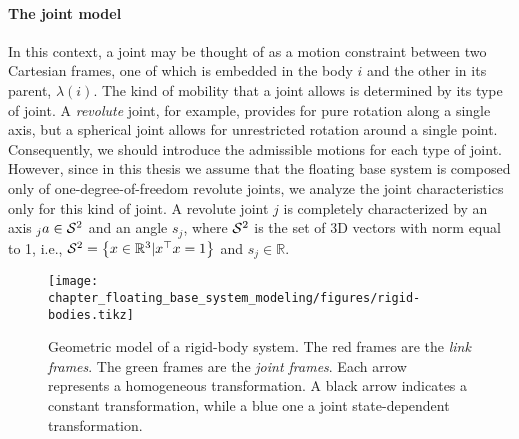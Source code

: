\paragraph{The joint model}
In this context, a joint may be thought of as a motion constraint between two Cartesian frames, one of which is embedded in the body $i$ and the other in its parent, $\lambda(i)$.
The kind of mobility that a joint allows is determined by its type of joint. A \emph{revolute} joint, for example, provides for pure rotation along a single axis, but a spherical joint allows for unrestricted rotation around a single point. Consequently, we should introduce the admissible motions for each type of joint. However, since in this thesis we assume that the floating base system is composed only of one-degree-of-freedom revolute joints, we analyze the joint characteristics only for this kind of joint. A revolute joint $j$ is completely characterized by an axis ${}_j a \in \mathcal{S}^2$ and an angle $s_j$, where $\mathcal{S}^2$ is the set of 3D vectors with norm equal to 1, i.e., $\mathcal{S}^2 = \left\{ x\in \mathbb{R}^3 | x^\top x = 1 \right\}$ and $s_j \in \mathbb{R}$. 

\begin{figure}[t]
    \centering
	\texttt{[image: chapter\_floating\_base\_system\_modeling/figures/rigid-bodies.tikz]}
	\caption[Geometric model of a rigid-body system.]{Geometric model of a rigid-body system. The red frames are the \emph{link frames}. The green frames are the \emph{joint frames}. Each arrow represents a homogeneous transformation. A black arrow indicates a constant transformation, while a blue one a joint state-dependent transformation.}
	\label{fig:geometric-model-rigid-bodies}
\end{figure}


